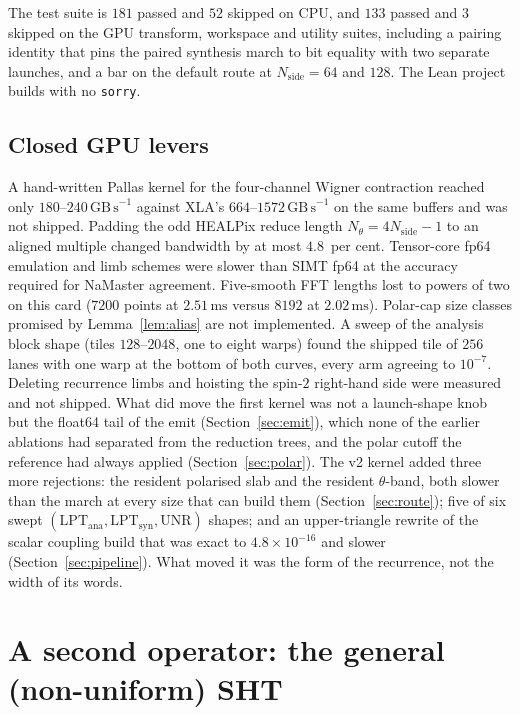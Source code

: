 \documentclass[usenatbib,useAMS]{mnras}
\begin{document}
The test suite is $181$ passed and $52$ skipped on CPU, and $133$ passed and $3$ skipped on the GPU transform, workspace and utility suites, including a pairing identity that pins the paired synthesis march to bit equality with two separate launches, and a bar on the default route at $N_{\mathrm{side}}=64$ and $128$. The Lean project builds with no \texttt{sorry}.

\subsection{Closed GPU levers}

A hand-written Pallas kernel for the four-channel Wigner contraction reached only $180$--$240\,\mathrm{GB\,s}^{-1}$ against XLA's $664$--$1572\,\mathrm{GB\,s}^{-1}$ on the same buffers and was not shipped. Padding the odd HEALPix reduce length $N_\theta=4N_{\mathrm{side}}-1$ to an aligned multiple changed bandwidth by at most $4.8$~per cent. Tensor-core fp64 emulation and limb schemes were slower than SIMT fp64 at the accuracy required for NaMaster agreement. Five-smooth FFT lengths lost to powers of two on this card ($7200$ points at $2.51\,\mathrm{ms}$ versus $8192$ at $2.02\,\mathrm{ms}$). Polar-cap size classes promised by Lemma~\ref{lem:alias} are not implemented. A sweep of the analysis block shape (tiles $128$--$2048$, one to eight warps) found the shipped tile of $256$ lanes with one warp at the bottom of both curves, every arm agreeing to $10^{-7}$. Deleting recurrence limbs and hoisting the spin-$2$ right-hand side were measured and not shipped. What did move the first kernel was not a launch-shape knob but the float64 tail of the emit (Section~\ref{sec:emit}), which none of the earlier ablations had separated from the reduction trees, and the polar cutoff the reference had always applied (Section~\ref{sec:polar}). The v2 kernel added three more rejections: the resident polarised slab and the resident $\theta$-band, both slower than the march at every size that can build them (Section~\ref{sec:route}); five of six swept $(\mathrm{LPT}_{\mathrm{ana}},\mathrm{LPT}_{\mathrm{syn}},\mathrm{UNR})$ shapes; and an upper-triangle rewrite of the scalar coupling build that was exact to $4.8\times10^{-16}$ and slower (Section~\ref{sec:pipeline}). What moved it was the form of the recurrence, not the width of its words.

\section{A second operator: the general (non-uniform) SHT}
\label{sec:nusht}
\end{document}
